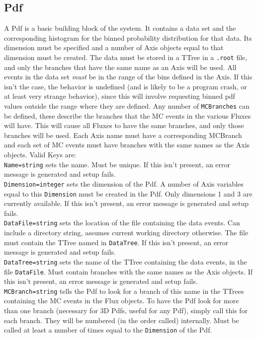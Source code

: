 \subsection{Pdf}
\label{sec:Pdf}
A Pdf is a basic building block of the system.  It contains a data set
and the corresponding histogram for the binned probability
distribution for that data.  Its dimension must be specified and a
number of Axis objects equal to that dimension must be created.  The
data must be stored in a TTree in a \verb|.root| file, and only the
branches that have the same name as an Axis will be used.  All events
in the data set \emph{must} be in the range of the bins defined in the
Axis.  If this isn't the case, the behavior is undefined (and is
likely to be a program crash, or at least very strange behavior),
since this will involve requesting binned pdf values outside the range
where they are defined.  Any number of \verb|MCBranches| can be
defined, these describe the branches that the MC events in the various
Fluxes will have.  This will cause all Fluxes to have the same
branches, and only those branches will be used.  Each Axis name must
have a corresponding MCBranch and each set of MC events must have
branches with the same names as the Axis objects.  Valid Keys
are:\medskip\\
\verb|Name=string| sets the name.  Must be unique.  If this isn't
present, an error message is generated and setup fails. \medskip\\
\verb|Dimension=integer| sets the dimension of the Pdf.  A number of
Axis variables equal to this \verb|Dimension| must be created in the
Pdf.  Only dimensions 1 and 3 are currently available.  If this isn't
present, an error message is generated and setup fails.\medskip\\
\verb|DataFile=string| sets the location of the file containing the
data events.  Can include a directory string, assumes current working
directory otherwise.  The file must contain the TTree named in
\verb|DataTree|.  If this isn't present, an error message is generated
and setup fails.\medskip\\
\verb|DataTree=string| sets the name of the TTree containing the data
events, in the file \verb|DataFile|.  Must contain branches with the
same names as the Axis objects.  If this isn't present, an error
message is generated and setup fails.\medskip\\
\verb|MCBranch=string| tells the Pdf to look for a branch of this name
in the TTrees containing the MC events in the Flux objects.  To have
the Pdf look for more than one branch (necessary for 3D Pdfs, useful
for any Pdf), simply call this for each branch.  They will be numbered
(in the order called) internally.  Must be called at least a number of
times equal to the \verb|Dimension| of the Pdf.

